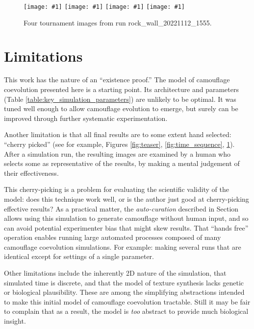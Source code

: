 \documentclass[letterpaper]{article}
\newcommand{\jargon}[1]{\textit{#1}}
\newcommand{\runID}{\footnotesize}
\newcommand{\igfour}[1]{\texttt{[image: \#1]}}
\begin{document}
\begin{figure}
    \igfour{20221112_1555_step_6495.png}
    \hfill
    \igfour{20221112_1555_step_5510.png}
    \hfill
    \igfour{20221112_1555_step_5681.png}
    \hfill
    \igfour{20221112_1555_step_6370.png}
    \caption{Four tournament images from run {\runID rock\_wall\_20221112\_1555}.}
    \label{fig:rock_wall_4x}
\end{figure}


\section{Limitations}
\label{subsec:limitations}
This work has the nature of an ``existence proof.'' The model of camouflage coevolution presented here is a starting point. Its architecture and parameters (Table \ref{table:key_simulation_parameters}) are unlikely to be optimal. It was tuned well enough to allow camouflage evolution to emerge, but surely can be improved through further systematic experimentation.
\par
Another limitation is that all final results are to some extent hand selected: ``cherry picked'' (see for example, Figures \ref{fig:teaser}, \ref{fig:time_sequence}, \ref{fig:rock_wall_4x}). After a simulation run, the resulting images are examined by a human who selects some as representative of the results, by making a mental judgement of their effectiveness.
\par
This cherry-picking is a problem for evaluating the scientific validity of the model: does this technique work well, or is the author just good at cherry-picking effective results? As a practical matter, the \jargon{auto-curation} described in Section  allows using this simulation to generate camouflage without human input, and so can avoid potential experimenter bias that might skew results. That ``hands free'' operation enables running large automated processes composed of many camouflage coevolution simulations. For example: making several runs that are identical except for settings of a single parameter.
\par
Other limitations include the inherently 2D nature of the simulation, that simulated time is discrete, and that the model of texture synthesis lacks genetic or biological plausibility. These are among the simplifying abstractions intended to make this initial model of camouflage coevolution tractable. Still it may be fair to complain that as a result, the model is \textit{too} abstract to provide much biological insight.
\par
\end{document}
